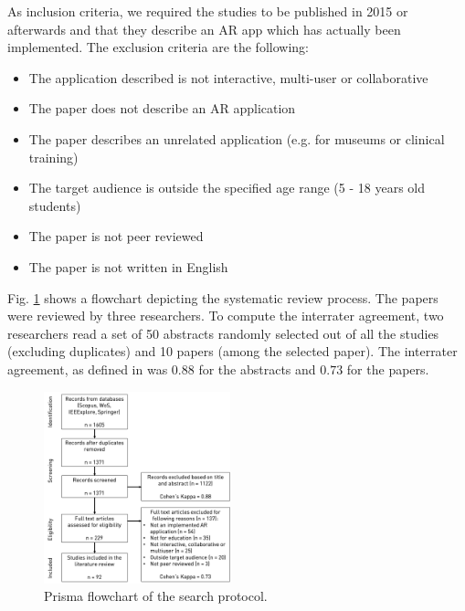As inclusion criteria, we required the studies to be published in 2015 or afterwards and that they describe an AR app which has actually been implemented. The exclusion criteria are the following:

\begin{itemize}
    \item The application described is not interactive, multi-user or collaborative
    \item The paper does not describe an AR application
    \item The paper describes an unrelated application (e.g. for museums or clinical training)
    \item The target audience is outside the specified age range (5 - 18 years old students)
    \item The paper is not peer reviewed
    \item The paper is not written in English
\end{itemize}

Fig. \ref{fig:flowchart} shows a flowchart depicting the systematic review process. The \papersToRead papers were reviewed by three researchers. To compute the interrater agreement, two researchers read a set of 50 abstracts randomly selected out of all the studies (excluding duplicates) and 10 papers (among the \papersSelected selected paper). The interrater agreement, as defined in \citep{cohen1960coefficient} was $0.88$ for the abstracts and $0.73$ for the papers.

\begin{figure}[ht]	
	\begin{center}
	\includegraphics[width=0.48\textwidth]{figures/prisma.png}
	\caption{Prisma flowchart of the search protocol.}
	\label{fig:flowchart}
    \end{center}
\end{figure}



